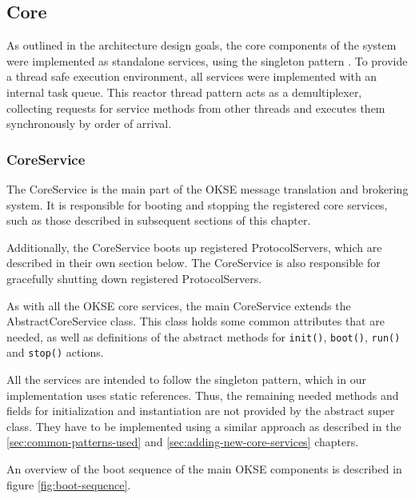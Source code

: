 \subsection{Core}
\label{subsec:architecture_and_implementation-implementation-core}

As outlined in the architecture design goals, the core components of the system were implemented as standalone services, using the singleton pattern \cite{singleton}. To provide a thread safe execution environment, all services were implemented with an internal task queue. This reactor thread pattern \cite{reactor-pattern} acts as a demultiplexer, collecting requests for service methods from other threads and executes them synchronously by order of arrival.

\subsubsection{CoreService}
\label{subsec:architecture_and_implementation-implementation-core-coreservice}

The CoreService is the main part of the OKSE message translation and brokering system. It is responsible for booting and stopping the registered core services, such as those described in subsequent sections of this chapter.

Additionally, the CoreService boots up registered ProtocolServers, which are described in their own section below. The CoreService is also responsible for gracefully shutting down registered ProtocolServers.

As with all the OKSE core services, the main CoreService extends the AbstractCoreService class. This class holds some common attributes that are needed, as well as definitions of the abstract methods for \verb!init()!, \verb!boot()!, \verb!run()! and \verb!stop()! actions.

All the services are intended to follow the singleton pattern, which in our implementation uses static references. Thus, the remaining needed methods and fields for initialization and instantiation are not provided by the abstract super class. They have to be implemented using a similar approach as described in the \ref{sec:common-patterns-used} and \ref{sec:adding-new-core-services} chapters.

An overview of the boot sequence of the main OKSE components is described in figure \ref{fig:boot-sequence}.


